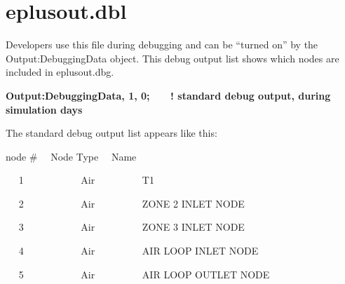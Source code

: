 \section{eplusout.dbl}\label{eplusout.dbl}

Developers use this file during debugging and can be ``turned on'' by the Output:DebuggingData object. This debug output list shows which nodes are included in eplusout.dbg.

\textbf{Output:DebuggingData, 1, 0;~~~ ! standard debug output, during simulation days}

The standard debug output list appears like this:

node \#~~ Node Type~~ Name

 ~~ 1~~~~~~~~~~~ Air~~~~~~~~~ T1

 ~~ 2~~~~~~~~~~~ Air~~~~~~~~~ ZONE 2 INLET NODE

 ~~ 3~~~~~~~~~~~ Air~~~~~~~~~ ZONE 3 INLET NODE

 ~~ 4~~~~~~~~~~~ Air~~~~~~~~~ AIR LOOP INLET NODE

 ~~ 5~~~~~~~~~~~ Air~~~~~~~~~ AIR LOOP OUTLET NODE
